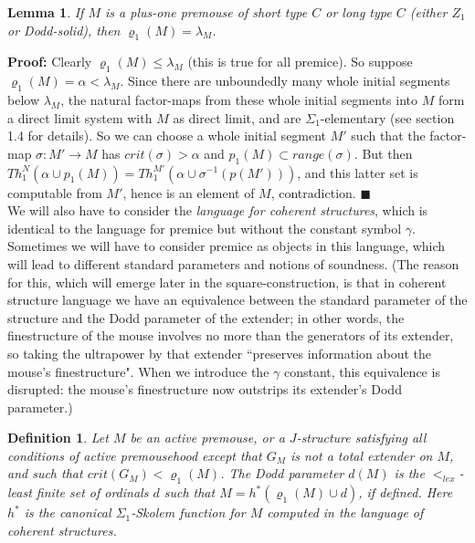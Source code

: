 \documentclass[12pt]{article}
\newtheorem{lem}[thm]{Lemma}
\newtheorem{defn}[thm]{Definition}
\begin{document}
\begin{lem} \label{projecttolambda}
If $M$ is a plus-one premouse of short type $C$ or long type $C$ (either $Z_1$ or Dodd-solid), then $\varrho_1 (M) = \lambda_M$.

\end{lem}

\textbf{Proof:}  Clearly $\varrho_1 (M) \leq \lambda_M$ (this is true for all premice).  So suppose $\varrho_1 (M) = \alpha < \lambda_M$.  Since there are unboundedly many whole initial segments below $\lambda_M$, the natural factor-maps from these whole initial segments into $M$ form a direct limit system with $M$ as direct limit, and are $\Sigma_1$-elementary (see \cite{zeman square proof} section 1.4 for details).  So we can choose a whole initial segment $M'$ such that the factor-map $\sigma: M' \longrightarrow M$ has $crit(\sigma ) > \alpha$ and $p_1 (M) \subset range(\sigma)$.  But then $Th_1^N ( \alpha \cup p_1 (M)) = Th_1^{M' } (\alpha \cup \sigma^{-1} (p(M' )) )$, and this latter set is computable from $M'$, hence is an element of $M$, contradiction. $\blacksquare$\\

We will also have to consider the \textit{language for coherent structures}, which is identical to the language for premice but without the constant symbol $\gamma$.  Sometimes we will have to consider premice as objects in this language, which will lead to different standard parameters and notions of soundness.  (The reason for this, which will emerge later in the square-construction, is that in coherent structure language we have an equivalence between the standard parameter of the structure and the Dodd parameter of the extender; in other words, the finestructure of the mouse involves no more than the generators of its extender, so taking the ultrapower by that extender ``preserves information about the mouse's finestructure".  When we introduce the $\gamma$ constant, this equivalence is disrupted: the mouse's finestructure now outstrips its extender's Dodd parameter.)\\

\begin{defn} \label{dodd parameter}
Let $M$ be an active premouse, or a $J$-structure satisfying all conditions of active premousehood except that $G_M$ is not a total extender on $M$, and such that $crit (G_M) < \varrho_1 (M)$.  The Dodd parameter $d(M)$ is the $<_{lex}$-least finite set of ordinals $d$ such that $M = h^* ( \varrho_1 (M) \cup d )$, if defined.  Here $h^*$ is the canonical $\Sigma_1$-Skolem function for $M$ computed in the language of coherent structures.
\end{defn}
\end{document}

